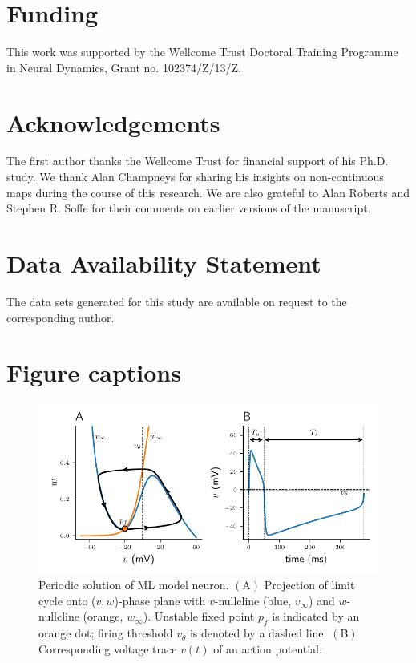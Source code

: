 \documentclass[utf8]{frontiersFPHY} %
\begin{document}
\section*{Funding}
This work was supported by the Wellcome Trust Doctoral Training Programme in Neural
Dynamics, Grant no. 102374/Z/13/Z.

\section*{Acknowledgements}
The first author thanks the Wellcome Trust for financial support of his Ph.D. study.
We thank Alan Champneys for sharing his insights on non-continuous maps during the course of this research.
We are also grateful to Alan Roberts and Stephen R. Soffe for their comments on earlier versions of the manuscript.

\section*{Data Availability Statement}
The data sets generated for this study are available on request to the corresponding author.




\section*{Figure captions}

\begin{figure}[h!]
	\centering
	\includegraphics{nullclines}
	\caption{Periodic solution of ML model neuron.
		$\bm{\mathrm{(A)}}$
		Projection of limit cycle onto ($v,w$)-phase plane with $v$-nullcline (blue,
		$v_\infty$) and $w$-nullcline (orange, $w_\infty$). Unstable fixed point $p_{f}$
		is indicated by an orange dot; firing threshold $v_{\theta}$ is denoted by a dashed line.
		$\bm{\mathrm{(B)}}$ Corresponding voltage trace $v(t)$ of an action potential.~\label{fig:nullclines}}
\end{figure}
\end{document}
